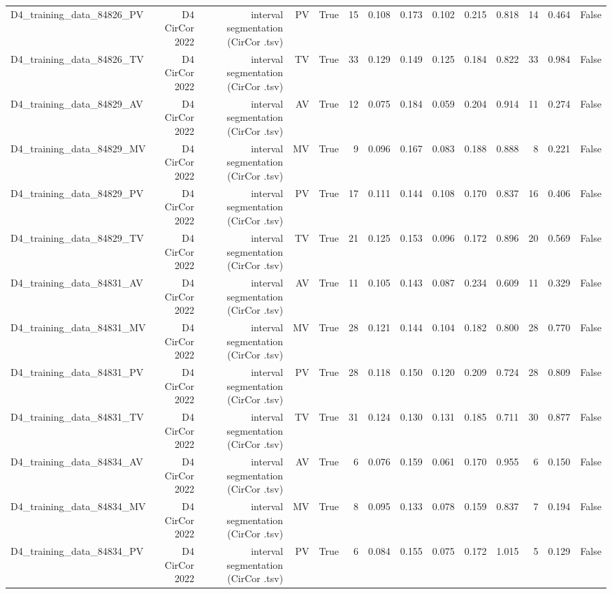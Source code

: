 \begin{table}[htbp]
\begin{tabular}{lrrrrrrrrrrrrr}
    D4\_training\_data\_84826\_PV & D4 CirCor 2022 & interval segmentation (CirCor .tsv) & PV & True & 15 & 0.108 & 0.173 & 0.102 & 0.215 & 0.818 & 14 & 0.464 & False \\
    D4\_training\_data\_84826\_TV & D4 CirCor 2022 & interval segmentation (CirCor .tsv) & TV & True & 33 & 0.129 & 0.149 & 0.125 & 0.184 & 0.822 & 33 & 0.984 & False \\
    D4\_training\_data\_84829\_AV & D4 CirCor 2022 & interval segmentation (CirCor .tsv) & AV & True & 12 & 0.075 & 0.184 & 0.059 & 0.204 & 0.914 & 11 & 0.274 & False \\
    D4\_training\_data\_84829\_MV & D4 CirCor 2022 & interval segmentation (CirCor .tsv) & MV & True & 9 & 0.096 & 0.167 & 0.083 & 0.188 & 0.888 & 8 & 0.221 & False \\
    D4\_training\_data\_84829\_PV & D4 CirCor 2022 & interval segmentation (CirCor .tsv) & PV & True & 17 & 0.111 & 0.144 & 0.108 & 0.170 & 0.837 & 16 & 0.406 & False \\
    D4\_training\_data\_84829\_TV & D4 CirCor 2022 & interval segmentation (CirCor .tsv) & TV & True & 21 & 0.125 & 0.153 & 0.096 & 0.172 & 0.896 & 20 & 0.569 & False \\
    D4\_training\_data\_84831\_AV & D4 CirCor 2022 & interval segmentation (CirCor .tsv) & AV & True & 11 & 0.105 & 0.143 & 0.087 & 0.234 & 0.609 & 11 & 0.329 & False \\
    D4\_training\_data\_84831\_MV & D4 CirCor 2022 & interval segmentation (CirCor .tsv) & MV & True & 28 & 0.121 & 0.144 & 0.104 & 0.182 & 0.800 & 28 & 0.770 & False \\
    D4\_training\_data\_84831\_PV & D4 CirCor 2022 & interval segmentation (CirCor .tsv) & PV & True & 28 & 0.118 & 0.150 & 0.120 & 0.209 & 0.724 & 28 & 0.809 & False \\
    D4\_training\_data\_84831\_TV & D4 CirCor 2022 & interval segmentation (CirCor .tsv) & TV & True & 31 & 0.124 & 0.130 & 0.131 & 0.185 & 0.711 & 30 & 0.877 & False \\
    D4\_training\_data\_84834\_AV & D4 CirCor 2022 & interval segmentation (CirCor .tsv) & AV & True & 6 & 0.076 & 0.159 & 0.061 & 0.170 & 0.955 & 6 & 0.150 & False \\
    D4\_training\_data\_84834\_MV & D4 CirCor 2022 & interval segmentation (CirCor .tsv) & MV & True & 8 & 0.095 & 0.133 & 0.078 & 0.159 & 0.837 & 7 & 0.194 & False \\
    D4\_training\_data\_84834\_PV & D4 CirCor 2022 & interval segmentation (CirCor .tsv) & PV & True & 6 & 0.084 & 0.155 & 0.075 & 0.172 & 1.015 & 5 & 0.129 & False \\

\end{tabular}
\end{table}
